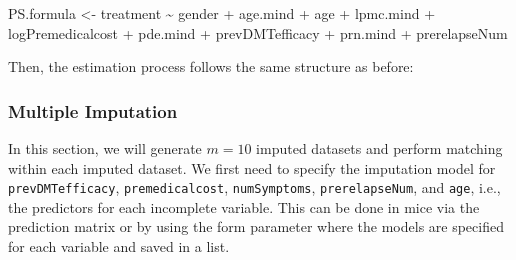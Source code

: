 \documentclass[
  letterpaper,
  DIV=11,
  numbers=noendperiod]{scrreprt}
\newenvironment{Shaded}{\begin{snugshade}}{\end{snugshade}}
\newcommand{\AttributeTok}[1]{\textcolor[rgb]{0.40,0.45,0.13}{#1}}
\newcommand{\FunctionTok}[1]{\textcolor[rgb]{0.28,0.35,0.67}{#1}}
\newcommand{\NormalTok}[1]{\textcolor[rgb]{0.00,0.23,0.31}{#1}}
\newcommand{\OtherTok}[1]{\textcolor[rgb]{0.00,0.23,0.31}{#1}}
\newcommand{\SpecialCharTok}[1]{\textcolor[rgb]{0.37,0.37,0.37}{#1}}
\newcommand{\StringTok}[1]{\textcolor[rgb]{0.13,0.47,0.30}{#1}}
\begin{document}
\begin{Shaded}
\begin{Highlighting}[]
\NormalTok{PS.formula }\OtherTok{\textless{}{-}}\NormalTok{ treatment }\SpecialCharTok{\textasciitilde{}}\NormalTok{ gender }\SpecialCharTok{+}\NormalTok{ age.mind }\SpecialCharTok{+}\NormalTok{ age }\SpecialCharTok{+}\NormalTok{ lpmc.mind }\SpecialCharTok{+} 
\NormalTok{  logPremedicalcost }\SpecialCharTok{+}\NormalTok{ pde.mind }\SpecialCharTok{+}\NormalTok{ prevDMTefficacy }\SpecialCharTok{+}\NormalTok{ prn.mind }\SpecialCharTok{+}\NormalTok{ prerelapseNum}
\end{Highlighting}
\end{Shaded}

Then, the estimation process follows the same structure as before:

\begin{Shaded}
\end{Shaded}

\hypertarget{multiple-imputation}{%
\subsubsection{Multiple Imputation}\label{multiple-imputation}}

In this section, we will generate \(m=10\) imputed datasets and perform
matching within each imputed dataset. We first need to specify the
imputation model for \texttt{prevDMTefficacy}, \texttt{premedicalcost},
\texttt{numSymptoms}, \texttt{prerelapseNum}, and \texttt{age}, i.e.,
the predictors for each incomplete variable. This can be done in mice
via the prediction matrix or by using the form parameter where the
models are specified for each variable and saved in a list.
\end{document}
